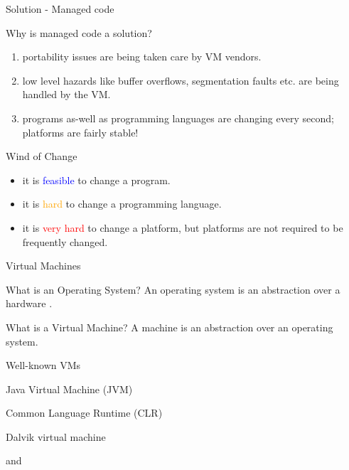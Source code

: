
\begin{frame}{Solution - Managed code}
\begin{block}{Why is managed code a solution?}
\begin{enumerate}
  \pause
  \item portability issues are being taken care by VM vendors.
  \pause
  \item low level hazards like buffer overflows, segmentation faults etc. are
  being handled by the VM.
  \pause
  \item programs as-well as programming languages are changing every second;
  platforms are fairly stable!
\end{enumerate}
\end{block}
\pause
\begin{block}{Wind of Change}
\begin{itemize}
  \item it is \textcolor{blue}{feasible} to change a program.
  \item it is \textcolor{orange}{hard} to change a programming language.
  \item it is \textcolor{red}{very hard} to change a platform, but platforms are
  not required to be frequently changed.
\end{itemize}
\end{block}
\end{frame}

\begin{frame}{Virtual Machines}
\begin{block}{What is an Operating System?}
An operating system is an abstraction over a hardware .
\end{block}
\pause
\begin{block}{What is a Virtual Machine?}
A  machine is an abstraction over an operating system.
\end{block}
\pause
\begin{exampleblock}{Well-known VMs}
\begin{description}
  \item[Java] Java Virtual Machine (JVM)
  \item[.Net] Common Language Runtime (CLR)
  \item[Android] Dalvik virtual machine
  \item
  and
\end{description}
\end{exampleblock}
\end{frame}

